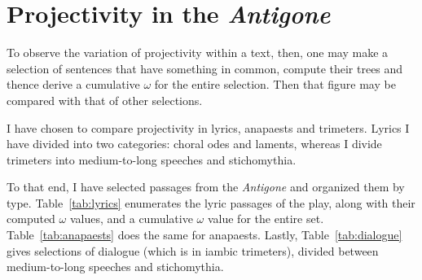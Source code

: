 \documentclass{article}
\newcommand{\FN}{\mathsf}
\begin{document}
\section{Projectivity in the \emph{Antigone}}

To observe the variation of projectivity within a text, then, one may make a
selection of sentences that have something in common, compute their trees and
thence derive a cumulative \ensuremath{\FN{\omega}} for the entire selection. Then that figure
may be compared with that of other selections.

I have chosen to compare projectivity in lyrics, anapaests and trimeters. Lyrics
I have divided into two categories: choral odes and laments, whereas I divide
trimeters into medium-to-long speeches and stichomythia.

To that end, I have selected passages from the \emph{Antigone} and organized
them by type. Table~\ref{tab:lyrics} enumerates the lyric passages of the play,
along with their computed \ensuremath{\FN{\omega}} values, and a cumulative \ensuremath{\FN{\omega}} value for the
entire set. Table~\ref{tab:anapaests} does the same for anapaests. Lastly,
Table~\ref{tab:dialogue} gives selections of dialogue (which is in iambic
trimeters), divided between medium-to-long speeches and stichomythia.
\end{document}
